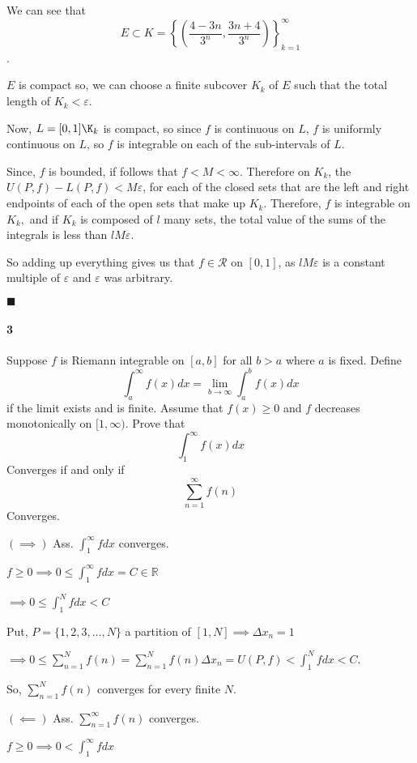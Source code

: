 \documentclass{article}
\newcommand\R{\mathbb{R}}
\begin{document}
We can see that $$E \subset K = \left\{\left(\frac{4- 3n}{3^n},
    \frac{3n+4}{3^n}\right)\right\}_{k=1}^\infty$$.

$E$ is compact so, we can choose a finite subcover $K_k$ of $E$ such
that the total length of $K_k <\varepsilon.$

Now, $L = [0,1]\K_k$ is compact, so since $f$ is continuous on $L$,
$f$ is uniformly continuous on $L$, so $f$ is integrable on each of
the sub-intervals of $L$.

Since, $f$ is bounded, if follows that $f < M < \infty$. Therefore on
$K_k$, the $U(P,f) -L(P,f) < M \varepsilon$, for each of the closed
sets that are the left and right endpoints of each of the open sets
that make up $K_k$. Therefore, $f$ is integrable on $K_k,$ and if
$K_k$ is composed of $l$ many sets, the total value of the sums of the
integrals is less than $lM\varepsilon.$

So adding up everything gives us that $f\in \mathcal{R}$ on $[0,1]$,
as $lM\varepsilon$ is a constant multiple of $\varepsilon$ and
$\varepsilon$ was arbitrary.

$\blacksquare$

\paragraph{3} Suppose $f$ is Riemann integrable on $[a,b]$ for all
$b>a$ where $a$ is fixed. Define
\[\int_a^\infty f(x)dx = \lim_{b\rightarrow \infty} \int_a^b f(x)dx\]
if the limit exists and is finite.
Assume that $f(x) \geq 0$ and $f$ decreases monotonically  on
$[1,\infty)$. Prove that
\[\int_1^\infty f(x)dx\]
Converges if and only if
\[\sum_{n=1}^\infty f(n)\]
Converges.


$(\implies)$ Ass. $\int_{1}^{\infty}f dx $ converges.

$ f \geq 0\implies 0 \leq \int_{1}^\infty f dx = C \in\R$

$\implies 0\leq \int_{1}^N f dx < C$

Put, $P = \{1,2,3,\dots, N\}$ a partition of $[1,N] \implies \varDelta x_n =1$

$\implies 0\leq \sum_{n=1}^N f(n) = \sum_{n=1}^N f(n)\varDelta x_n = U(P,f) < \int_{1}^N f dx < C$.

So, $\sum_{n=1}^N f(n)$ converges for every finite $N$.

$(\impliedby)$ Ass. $\sum_{n=1}^\infty f(n)$ converges.

$f\geq 0 \implies 0 < \int_{1}^\infty f dx$
\end{document}
